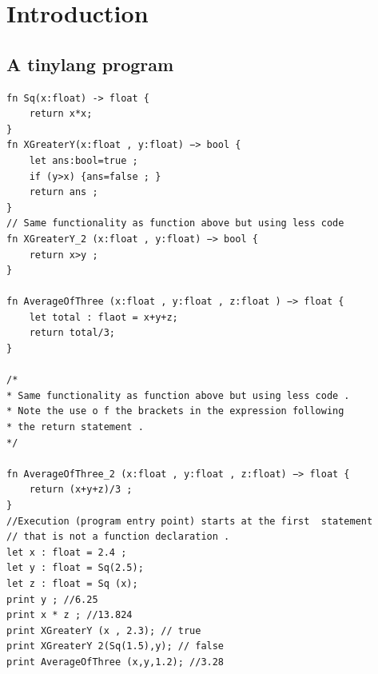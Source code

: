 \setcounter{chapter}{-1}
\chapter{Introduction}
\section{A tinylang program}
\begin{lstlisting}[caption = A semantically and syntactically correct program in \emph{TinyLang}.]
fn Sq(x:float) -> float {
    return x*x;
}
fn XGreaterY(x:float , y:float) −> bool {
    let ans:bool=true ;
    if (y>x) {ans=false ; }
    return ans ;
}
// Same functionality as function above but using less code
fn XGreaterY_2 (x:float , y:float) −> bool {
    return x>y ;
}

fn AverageOfThree (x:float , y:float , z:float ) −> float {
    let total : flaot = x+y+z;
    return total/3;
}

/*
* Same functionality as function above but using less code .
* Note the use o f the brackets in the expression following
* the return statement .
*/

fn AverageOfThree_2 (x:float , y:float , z:float) −> float {
    return (x+y+z)/3 ;
}
//Execution (program entry point) starts at the first  statement
// that is not a function declaration .
let x : float = 2.4 ;
let y : float = Sq(2.5);
let z : float = Sq (x);
print y ; //6.25
print x * z ; //13.824
print XGreaterY (x , 2.3); // true
print XGreaterY 2(Sq(1.5),y); // false
print AverageOfThree (x,y,1.2); //3.28
\end{lstlisting}











